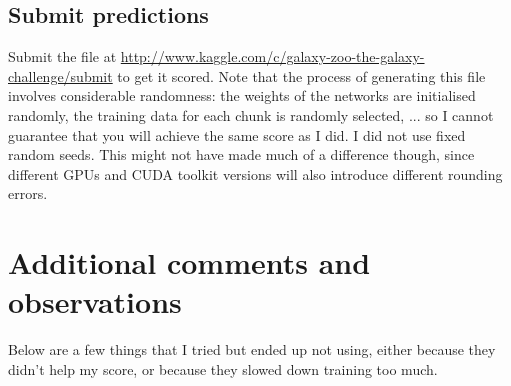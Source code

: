 \documentclass[a4paper,10pt]{article}
\begin{document}
\subsection{Submit predictions}

Submit the file  at \url{http://www.kaggle.com/c/galaxy-zoo-the-galaxy-challenge/submit} to get it scored. Note that the process of generating this file involves considerable randomness: the weights of the networks are initialised randomly, the training data for each chunk is randomly selected, ... so I cannot guarantee that you will achieve the same score as I did. I did not use fixed random seeds. This might not have made much of a difference though, since different GPUs and CUDA toolkit versions will also introduce different rounding errors.

\section{Additional comments and observations}

Below are a few things that I tried but ended up not using, either because they didn't help my score, or because they slowed down training too much.
\end{document}
